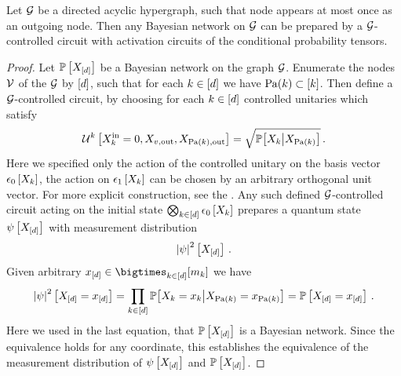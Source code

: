 \begin{lemma}
    \label{lem:BNtoGCC}
    Let $\mathcal{G}$ be a directed acyclic hypergraph, such that node appears at most once as an outgoing node.
    Then any Bayesian network on $\mathcal{G}$ can be prepared by a $\mathcal{G}$-controlled circuit with activation circuits of the conditional probability tensors.
\end{lemma}
\begin{proof}
    Let $\mathbb{P}\left[X_{[d]}\right]$ be a Bayesian network on the graph $\mathcal{G}$.
    Enumerate the nodes $\mathcal{V}$ of the $\mathcal{G}$ by $[d]$, such that for each $k\in[d]$ we have $\mathrm{Pa}(k)\subset[k]$.
    Then define a $\mathcal{G}$-controlled circuit, by choosing for each $k\in[d]$ controlled unitaries which satisfy
    \begin{align*}
        \mathcal{U}^{k}\left[X_{k}^{\mathrm{in}}=0,X_{v,\mathrm{out}},X_{\mathrm{Pa}(k),\mathrm{out}}\right]
        =\sqrt{\mathbb{P}\big[X_{k}\big|X_{\mathrm{Pa}(k)}\big]} \, .
    \end{align*}
    Here we specified only the action of the controlled unitary on the basis vector $\epsilon_{0}\left[X_{k}\right]$, the action on $\epsilon_{1}\left[X_{k}\right]$ can be chosen by an arbitrary orthogonal unit vector. %
    For more explicit construction, see the \activationCircuits{}.
    Any such defined $\mathcal{G}$-controlled circuit acting on the initial state $\bigotimes_{k\in[d]}\epsilon_{0}\left[X_{k}\right]$ prepares a quantum state $\psi\left[X_{[d]}\right]$ with measurement distribution
    \begin{align*}
        \left|\psi\right|^2\left[X_{[d]}\right] \, .
    \end{align*}
    Given arbitrary $\shortcatindicesin$ we have
    \begin{align*}
        \left|\psi\right|^2\left[X_{[d]}=x_{[d]}\right]
        = \prod_{k\in[d]} \mathbb{P}\big[X_{k}=x_{k}\big|X_{\mathrm{Pa}(k)}=x_{\mathrm{Pa}(k)}\big]
        = \mathbb{P}\left[X_{[d]}=x_{[d]}\right] \, .
    \end{align*}
    Here we used in the last equation, that $\mathbb{P}\left[X_{[d]}\right]$ is a Bayesian network.
    Since the equivalence holds for any coordinate, this establishes the equivalence of the measurement distribution of $\psi\left[X_{[d]}\right]$ and $\mathbb{P}\left[X_{[d]}\right]$.
\end{proof}

